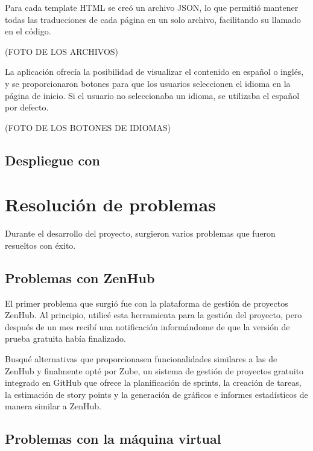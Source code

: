 Para cada template HTML se creó un archivo JSON, lo que permitió mantener todas las traducciones de cada página en un solo archivo, facilitando su llamado en el código.

    (FOTO DE LOS ARCHIVOS)

La aplicación ofrecía la posibilidad de visualizar el contenido en español o inglés, y se proporcionaron botones para que los usuarios seleccionen el idioma en la página de inicio. Si el usuario no seleccionaba un idioma, se utilizaba el español por defecto.

    (FOTO DE LOS BOTONES DE IDIOMAS)

\subsection{Despliegue con }

\section{Resolución de problemas}
Durante el desarrollo del proyecto, surgieron varios problemas que fueron resueltos con éxito.

\subsection{Problemas con ZenHub}
El primer problema que surgió fue con la plataforma de gestión de proyectos ZenHub. Al principio, utilicé esta herramienta para la gestión del proyecto, pero después de un mes recibí una notificación informándome de que la versión de prueba gratuita había finalizado.

Busqué alternativas que proporcionasen funcionalidades similares a las de ZenHub y finalmente opté por Zube, un sistema de gestión de proyectos gratuito integrado en GitHub que ofrece la planificación de sprints, la creación de tareas, la estimación de story points y la generación de gráficos e informes estadísticos de manera similar a ZenHub.

\subsection{Problemas con la máquina virtual}